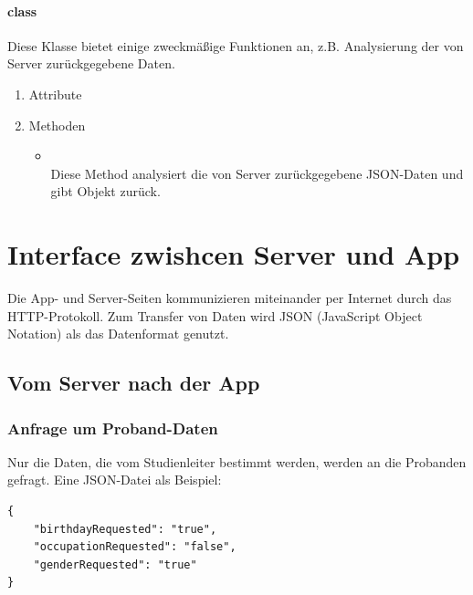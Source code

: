 \documentclass[a4paper]{scrreprt}
\begin{document}
{                \subsubsection{class }

                    Diese Klasse bietet einige zweckmäßige Funktionen an, z.B. Analysierung der  von Server zurückgegebene Daten.

                    \begin{enumerate}
                        \item Attribute
                        \item Methoden
                            \begin{itemize}
                                \item {\large {}}\\
                                Diese Method analysiert die von Server zurückgegebene JSON-Daten und gibt  Objekt zurück.
                            \end{itemize}
                    \end{enumerate}


    \chapter{Interface zwishcen Server und App}
        Die App- und Server-Seiten kommunizieren miteinander per Internet durch das HTTP-Protokoll. Zum Transfer von Daten wird JSON (JavaScript Object Notation) als das Datenformat genutzt.

        \section{Vom Server nach der App}
            \subsection{Anfrage um Proband-Daten}
                Nur die Daten, die vom Studienleiter bestimmt werden, werden an die Probanden gefragt. Eine JSON-Datei als Beispiel:
                \begin{lstlisting}
{
    "birthdayRequested": "true",
    "occupationRequested": "false",
    "genderRequested": "true"
}
                \end{lstlisting}

}
\end{document}
